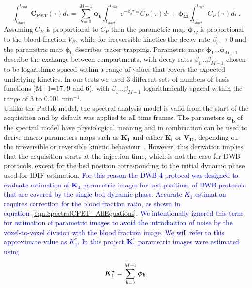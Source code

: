 \begin{itemize}
\begin{equation} \label{SpectralEq}
\int_{t_{start}}^{t_{end}} \boldsymbol{C_{PET}}(\tau) d\tau =  \sum_{b=0}^{M-1}  \boldsymbol{\phi_b} \int_{t_{start}}^{t_{end}} e^{-\beta_b \tau} \ast C_P(\tau)  d\tau +\boldsymbol{\phi_M} \int_{t_{start}}^{t_{end}} C_{P}(\tau) d\tau   \ .
\end{equation}
Assuming $C_{B}$ is proportional to $C_{P}$ then the parametric map $\boldsymbol\phi_M$ is proportional to the blood fraction $V_B$, while for irreversible kinetics the decay rate $\beta_0\xrightarrow{}0$ and the parametric map $\boldsymbol\phi_0$ describes tracer trapping. Parametric maps $\boldsymbol{\phi}_1 ... \boldsymbol{\phi}_{M-1}$ describe the exchange between compartments, with decay rates $\beta_1 ... \beta_{M-1}$
chosen to be logarithmic spaced within a range of values that covers the expected underlying kinetics. 
In our tests we used 3 different sets of numbers of basis functions (M+1=17, 9 and 6), with $\beta_1 ... \beta_{M-1}$ logarithmically spaced within the range of 3 to 0.001 $\mathrm{min}^{-1}$. \\
Unlike the Patlak model, the spectral analysis model is valid from the start of the acquisition and by default was applied to all time frames. The parameters $\boldsymbol{\phi_b}$ of the spectral model have physiological meaning and in combination can be used to derive macro-parameters maps such as $\boldsymbol{K_1}$ and either $\boldsymbol{K_i}$ or $\boldsymbol{V_D}$, 
depending on the irreversible or reversible kinetic behaviour~\cite{Gunn2002}.
However, this derivation implies that the acquisition starts at the injection time, which is not the case for DWB protocols, except for the bed position corresponding to the initial dynamic phase used for IDIF estimation. 
\textcolor{blue}{For this reason the DWB-4 protocol was designed to evaluate estimation of $\boldsymbol{K_1}$ parametric images for bed positions of DWB protocols that are covered by the single bed dynamic phase. Accurate $K_1$ estimation requires correction for the blood fraction ratio, as shown in equation~\ref{eqn:SpectralCPET_AllEquations}. We intentionally ignored this term for estimation of parametric images to avoid the introduction of noise by the voxel-to-voxel division with the blood fraction image. We will refer to this approximate value as $K_1^*$. In this project $\boldsymbol{K_1^*}$ parametric images were estimated using}

\begin{equation} \label{SpectralK1}
\boldsymbol{K_1^*} = \sum_{b=0}^{M-1} \boldsymbol{\phi_b} \\ . \\
\end{equation}


\end{itemize}

